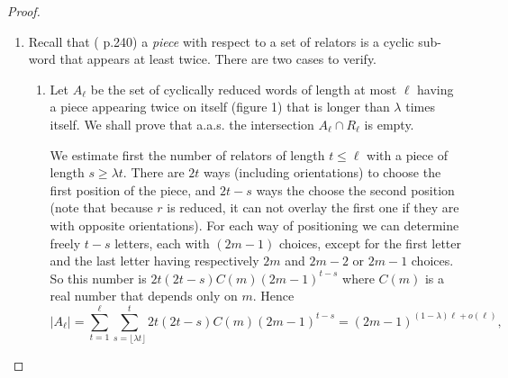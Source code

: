 \documentclass{article}
\newcommand\flr[1]{\lfloor #1 \rfloor}
\theoremstyle{remark}
\begin{document}
\begin{proof} \quad
\begin{enumerate}
    \item Recall that (\cite{LS77} p.240) a \textit{piece} with respect to a set of relators is a cyclic sub-word that appears at least twice. There are two cases to verify.
    \begin{enumerate}
        \item  Let $A_\ell$ be the set of cyclically reduced words of length at most $\ell$ having a piece appearing twice on itself (figure 1) that is longer than $\lambda$ times itself. We shall prove that a.a.s. the intersection $A_\ell \cap R_\ell$ is empty.
        \begin{center}
        \end{center}
        We estimate first the number of relators of length $t\leq \ell$ with a piece of length $s\geq\lambda t$. There are $2t$ ways (including orientations) to choose the first position of the piece, and $2t-s$ ways the choose the second position (note that because $r$ is reduced, it can not overlay the first one if they are with opposite orientations). For each way of positioning we can determine freely $t-s$ letters, each with $(2m-1)$ choices, except for the first letter and the last letter having respectively $2m$ and $2m-2$ or $2m-1$ choices. So this number is $2t(2t-s)C(m)(2m-1)^{t-s}$ where $C(m)$ is a real number that depends only on $m$. Hence
        \[|A_\ell| = \sum_{t=1}^\ell \sum_{s=\flr{\lambda t}}^t 2t(2t-s)C(m)(2m-1)^{t-s} = (2m-1)^{(1-\lambda)\ell+o(\ell)},\]
        

\end{enumerate}
\end{enumerate}
\end{proof}
\end{document}
